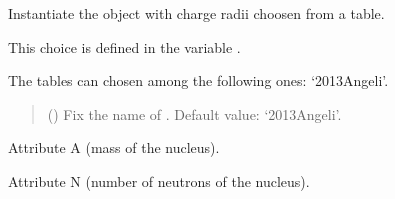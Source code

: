 \documentclass[letterpaper,10pt,english]{sphinxmanual}
\begin{document}
\begin{fulllineitems}
\label{\detokenize{source/api/setup_rad_ch:nucleardatapy.setup_rad_ch.SetupRadCh}}
\pysigstartsignatures
{}
\pysigstopsignatures
\sphinxAtStartPar
Instantiate the object with charge radii choosen    from a table.

\sphinxAtStartPar
This choice is defined in the variable .

\sphinxAtStartPar
The tables can chosen among the following ones:    ‘2013\sphinxhyphen{}Angeli’.
\begin{quote}\begin{description}
\sphinxAtStartPar
{} (\sphinxstyleliteralemphasis{\sphinxupquote{, }}) \textendash{} Fix the name of . Default value: ‘2013\sphinxhyphen{}Angeli’.

\end{description}\end{quote}

\sphinxAtStartPar
{}

\begin{fulllineitems}
\label{\detokenize{source/api/setup_rad_ch:nucleardatapy.setup_rad_ch.SetupRadCh.A}}
\pysigstartsignatures
{}
\pysigstopsignatures
\sphinxAtStartPar
Attribute A (mass of the nucleus).

\end{fulllineitems}


\begin{fulllineitems}
\label{\detokenize{source/api/setup_rad_ch:nucleardatapy.setup_rad_ch.SetupRadCh.N}}
\pysigstartsignatures
{}
\pysigstopsignatures
\sphinxAtStartPar
Attribute N (number of neutrons of the nucleus).


\end{fulllineitems}
\end{fulllineitems}
\end{document}
